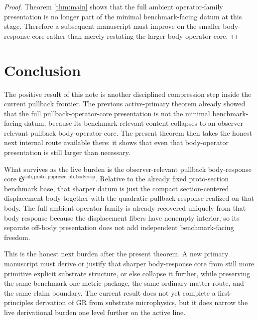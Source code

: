 \documentclass[11pt]{article}
\newcommand{\PullbackBodyResponseCore}{\mathfrak S^{\mathrm{sub,proto,pppresec,pb,bodyresp}}}
\begin{document}
\begin{proof}
Theorem \ref{thm:main} shows that the full ambient operator-family presentation is no longer part of the minimal benchmark-facing datum at this stage. Therefore a subsequent manuscript must improve on the smaller body-response core rather than merely restating the larger body-operator core.
\end{proof}

\section{Conclusion}

The positive result of this note is another disciplined compression step inside the current pullback frontier. The previous active-primary theorem already showed that the full pullback-operator-core presentation is not the minimal benchmark-facing datum, because its benchmark-relevant content collapses to an observer-relevant pullback body-operator core. The present theorem then takes the honest next internal route available there: it shows that even that body-operator presentation is still larger than necessary.

What survives as the live burden is the observer-relevant pullback body-response core \(\PullbackBodyResponseCore\). Relative to the already fixed proto-section benchmark base, that sharper datum is just the compact section-centered displacement body together with the quadratic pullback response realized on that body. The full ambient operator family is already recovered uniquely from that body response because the displacement fibers have nonempty interior, so its separate off-body presentation does not add independent benchmark-facing freedom.

This is the honest next burden after the present theorem. A new primary manuscript must derive or justify that sharper body-response core from still more primitive explicit substrate structure, or else collapse it further, while preserving the same benchmark one-metric package, the same ordinary matter route, and the same claim boundary. The current result does not yet complete a first-principles derivation of GR from substrate microphysics, but it does narrow the live derivational burden one level further on the active line.
\end{document}
